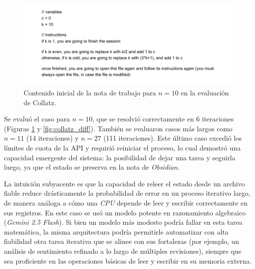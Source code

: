\begin{figure}[h]
    \centering
    \includegraphics[width=1.0\textwidth]{figures/collatz_init_10.pdf}
    \caption{Contenido inicial de la nota de trabajo para $n=10$ en la evaluación de Collatz.}
    \label{fig:collatz_code}
\end{figure}

Se evaluó el caso para $n=10$, que se resolvió correctamente en 6 iteraciones (Figuras \ref{fig:collatz_code} y \ref{fig:collatz_diff}). También se evaluaron casos más largos como $n=11$ (14 iteraciones) y $n=27$ (111 iteraciones). Este último caso excedió los límites de cuota de la API y requirió reiniciar el proceso, lo cual demostró una capacidad emergente del sistema: la posibilidad de dejar una tarea y seguirla luego, ya que el estado se preserva en la nota de \textit{Obsidian}.

La intuición subyacente es que la capacidad de releer el estado desde un archivo fiable reduce drásticamente la probabilidad de error en un proceso iterativo largo, de manera análoga a cómo una \textit{CPU} depende de leer y escribir correctamente en sus registros. En este caso se usó un modelo potente en razonamiento algebraico (\textit{Gemini 2.5 Flash}). Si bien un modelo más modesto podría fallar en esta tarea matemática, la misma arquitectura podría permitirle automatizar con alta fiabilidad otra tarea iterativa que se alinee con sus fortalezas (por ejemplo, un análisis de sentimiento refinado a lo largo de múltiples revisiones), siempre que sea proficiente en las operaciones básicas de leer y escribir en su memoria externa.

